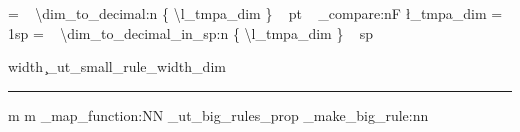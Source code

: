 {{{\begin{minipage} [ t ] { \l_tmpb_dim }
{{                   = ~ \SI { \dim_to_decimal:n { \l_tmpa_dim } } { pt } ~
               }
               \dim_compare:nF { \l_tmpa_dim = 1sp } {
                   = ~ \SI { \dim_to_decimal_in_sp:n { \l_tmpa_dim } } { sp }
               }
         }
         \par \vspace{ \c_ut_inner_sep_dim }
      \end{minipage}
      \hspace { \c_ut_inner_sep_dim }
       {
         { \color { l_ut_fill_color ! 26 } \vrule width \c_ut_small_rule_width_dim }
         \hspace { -\c_ut_small_rule_width_dim }
         \color { l_ut_fill_color }
         \rule
            [ \dim_eval:n { -\l_tmpa_dim + \c_ut_inner_sep_dim } ]
            { \c_ut_small_rule_width_dim }
            { \l_tmpa_dim }
      }
   }%
} }
\NewDocumentCommand { \DrawRule } { m m } {
   \hspace  { -\c_ut_big_rule_box_width_dim }
}
\NewDocumentCommand{ \DrawRules } {  } {
   \prop_map_function:NN \g_ut_big_rules_prop \ut_make_big_rule:nn
}

\ExplSyntaxOff%

